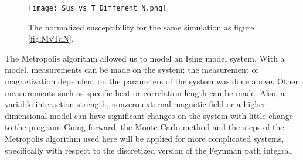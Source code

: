 \documentclass[11pt]{article}
\begin{document}
\begin{figure}[h]
	\centering
\texttt{[image: Sus\_vs\_T\_Different\_N.png]}
	\caption{The normalized susceptibility for the same simulation as figure \ref{fig:MvTdN}.}
	\label{fig:SvTdN}
\end{figure}

The Metropolis algorithm allowed us to model an Ising model system. With a model, measurements can be made on the system; the measurement of magnetization dependent on the parameters of the system was done above. Other measurements such as specific heat or correlation length can be made. Also, a variable interaction strength, nonzero external magnetic field or a higher dimensional model can have significant changes on the system with little change to the program. Going forward, the Monte Carlo method and the steps of the Metropolis algorithm used here will be applied for more complicated systems, specifically with respect to the discretized version of the Feynman path integral.
\end{document}
